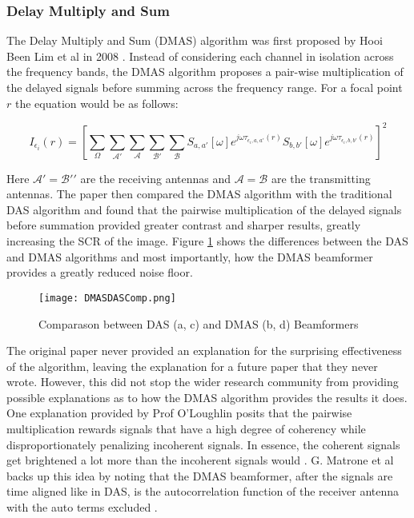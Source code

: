 \subsubsection{Delay Multiply and Sum}
The Delay Multiply and Sum (DMAS) algorithm was first proposed by Hooi Been Lim et al in 2008
\cite{beenlimConfocalMicrowaveImaging2008}. Instead of considering each channel in isolation across the frequency bands,
the DMAS algorithm proposes a pair-wise multiplication of the delayed signals before summing across the frequency range.
For a focal point $r$ the equation would be as follows:

\begingroup
\large
\begin{equation}
    I_{\epsilon_i}(r) = \left [\sum_{\Omega}\sum_{\mathcal{A}'}\sum_{\mathcal{A}}\sum_{\mathcal{B}'}\sum_{\mathcal{B}} S_{a, a'}[\omega]e^{j\omega \tau_{\epsilon_i, a, a'}(r)} S_{b, b'}[\omega]e^{j\omega \tau_{\epsilon_i, b, b'}(r)}\right ]^2
    \label{eq:DMASBeamformer}
\end{equation}
\endgroup

Here $\mathcal{A}' = \mathcal{B'}'$ are the receiving antennas and $\mathcal{A} = \mathcal{B}$ are the transmitting
antennas. The paper then compared the DMAS algorithm with the traditional DAS algorithm and found that the pairwise
multiplication of the delayed signals before summation provided greater contrast and sharper results, greatly increasing
the SCR of the image. Figure \ref{fig:DMASDASComp} shows the differences between the DAS and DMAS algorithms and most
importantly, how the DMAS beamformer provides a greatly reduced noise floor.

\begin{figure}[!h]
    \texttt{[image: DMASDASComp.png]}
    \centering
    \caption{Comparason between DAS (a, c) and DMAS (b, d) Beamformers}
    \label{fig:DMASDASComp}
\end{figure}

The original paper never provided an explanation for the surprising effectiveness of the algorithm, leaving
the explanation for a future paper that they never wrote. However, this did not stop the wider research community from
providing possible explanations as to how the DMAS algorithm provides the results it does. One explanation provided by
Prof O'Loughlin posits that the pairwise multiplication rewards signals that have a high degree of coherency while
disproportionately penalizing incoherent signals. In essence, the coherent signals get brightened a lot more than the
incoherent signals would \cite{oloughlinComparingRadarBasedBreast2019}. G. Matrone et al backs up this idea by
noting that the DMAS beamformer, after the signals are time aligned like in DAS, is the autocorrelation function of the
receiver antenna with the auto terms excluded \cite{g.matroneDelayMultiplySum2015}.